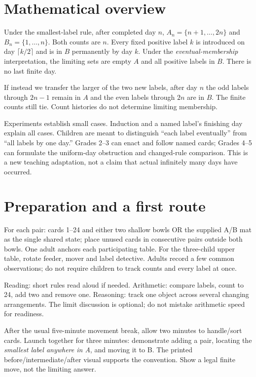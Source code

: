 \documentclass[11pt,letterpaper]{article}
\begin{document}
\section*{Mathematical overview}
Under the smallest-label rule, after completed day $n$, $A_n=\{n+1,\ldots,2n\}$ and $B_n=\{1,\ldots,n\}$. Both counts are $n$. Every fixed positive label $k$ is introduced on day $\lceil k/2\rceil$ and is in $B$ permanently by day $k$. Under the \emph{eventual-membership} interpretation, the limiting sets are empty $A$ and all positive labels in $B$. There is no last finite day.

If instead we transfer the larger of the two new labels, after day $n$ the odd labels through $2n-1$ remain in $A$ and the even labels through $2n$ are in $B$. The finite counts still tie. Count histories do not determine limiting membership.

Experiments establish small cases. Induction and a named label's finishing day explain all cases. Children are meant to distinguish ``each label eventually'' from ``all labels by one day.'' Grades 2--3 can enact and follow named cards; Grades 4--5 can formulate the uniform-day obstruction and changed-rule comparison. This is a new teaching adaptation, not a claim that actual infinitely many days have occurred.
\newpage
\section*{Preparation and a first route}
For each pair: cards 1--24 and either two shallow bowls OR the supplied A/B mat as the single shared state; place unused cards in consecutive pairs outside both bowls. One adult anchors each participating table. For the three-child upper table, rotate feeder, mover and label detective. Adults record a few common observations; do not require children to track counts and every label at once.

Reading: short rules read aloud if needed. Arithmetic: compare labels, count to 24, add two and remove one. Reasoning: track one object across several changing arrangements. The limit discussion is optional; do not mistake arithmetic speed for readiness.

After the usual five-minute movement break, allow two minutes to handle/sort cards. Launch together for three minutes: demonstrate adding a pair, locating the \emph{smallest label anywhere in A}, and moving it to B. The printed before/intermediate/after visual supports the convention. Show a legal finite move, not the limiting answer.
\end{document}
